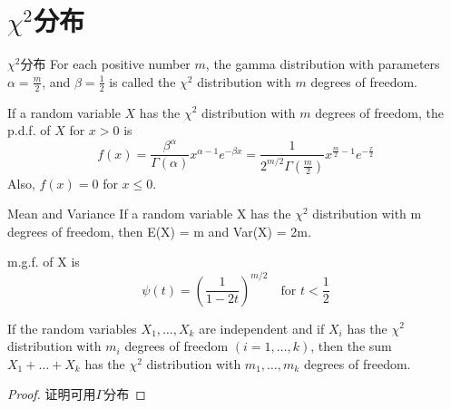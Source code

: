\documentclass[../main.tex]{subfiles}
\begin{document}
\section{$\chi^2$分布}

\begin{definition}{$\chi^2$分布}{}
For each positive number $m$, the gamma distribution with parameters $\alpha=\frac{m}{2}$, and $\beta=\frac{1}{2}$ is called the $\chi^2$ distribution with $m$ degrees of freedom. 

If a random variable $X$ has the $\chi^2$ distribution with $m$ degrees of freedom, the p.d.f. of $X$ for $x > 0$ is
\begin{equation}\label{}
f(x)=\frac{\beta^\alpha}{\Gamma(\alpha)} x^{\alpha-1}e^{-\beta x}=\frac{1}{2^{m/2}\Gamma(\frac{m}{2})}x^{\frac{m}{2}-1}e^{-\frac{x}{2}}
\end{equation}
Also, $f (x) = 0$ for $x \leqslant 0$.
\end{definition}

\begin{theorem}{Mean and Variance}
If a random variable X has the $\chi^2$ distribution with m degrees of
freedom, then E(X) = m and Var(X) = 2m.
\end{theorem}
m.g.f. of X is
\begin{equation}\label{}
\psi(t)=(\frac{1}{1-2t})^{m/2} \quad\text{for $t<\frac{1}{2}$}
\end{equation}

\begin{theorem}{}{}
If the random variables $X_1, \dots, X_k$ are independent and if $X_i$ has the $\chi^2$ distribution with $m_i$ degrees of freedom $(i = 1, \dots, k)$, then the sum $X_1 + \dots + X_k$ has the $\chi^2$ distribution with $m_1, \dots, m_k$ degrees of freedom.
\end{theorem}
\begin{proof}
证明可用$\Gamma$分布
\end{proof}
\end{document}
